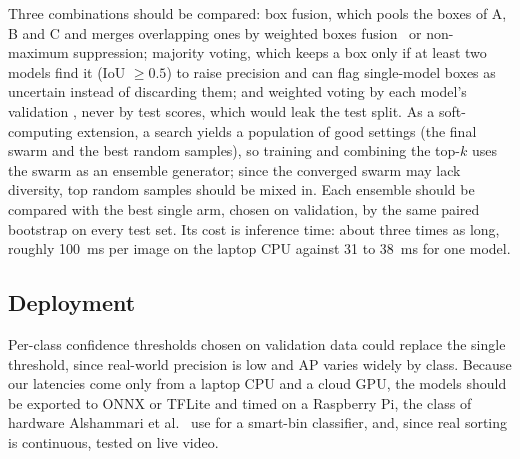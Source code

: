 Three combinations should be compared: box fusion, which pools the boxes of A, B and C and merges overlapping ones by weighted boxes fusion~\cite{solovyev2021weighted} or non-maximum suppression; majority voting, which keeps a box only if at least two models find it (IoU $\ge 0.5$) to raise precision and can flag single-model boxes as uncertain instead of discarding them; and weighted voting by each model's validation \mapfifty, never by test scores, which would leak the test split. As a soft-computing extension, a search yields a population of good settings (the final swarm and the best random samples), so training and combining the top-$k$ uses the swarm as an ensemble generator; since the converged swarm may lack diversity, top random samples should be mixed in. Each ensemble should be compared with the best single arm, chosen on validation, by the same paired bootstrap on every test set. Its cost is inference time: about three times as long, roughly 100~ms per image on the laptop CPU against 31 to 38~ms for one \genone model.

\subsection{Deployment}
\label{subsec:fw-deploy}

Per-class confidence thresholds chosen on validation data could replace the single threshold, since real-world precision is low and AP varies widely by class. Because our latencies come only from a laptop CPU and a cloud GPU, the models should be exported to ONNX or TFLite and timed on a Raspberry Pi, the class of hardware Alshammari et al.~\cite{alshammari2025smart} use for a smart-bin classifier, and, since real sorting is continuous, tested on live video.

